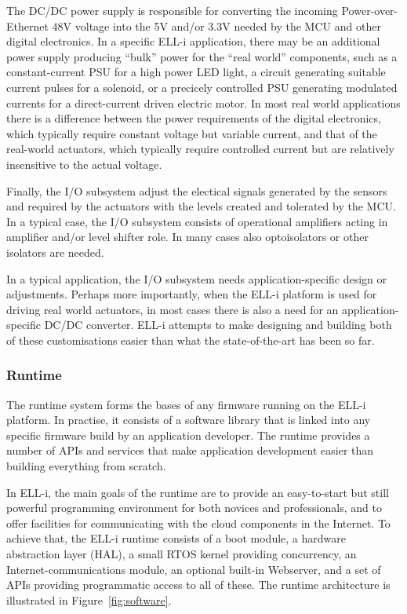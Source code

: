 \documentclass[draft,a4paper]{siamltex}
\begin{document}
The DC/DC power supply is responsible for converting the incoming
Power-over-Ethernet 48V voltage into the 5V and/or 3.3V needed by the
MCU and other digital electronics.  In a specific ELL-i application,
there may be an additional power supply producing ``bulk'' power for
the ``real world'' components, such as a constant-current PSU for a
high power LED light, a circuit generating suitable current pulses for
a solenoid, or a precicely controlled PSU generating modulated
currents for a direct-current driven electric motor.  In most real
world applications there is a difference between the power
requirements of the digital electronics, which typically require
constant voltage but variable current, and that of the real-world
actuators, which typically require controlled current but are
relatively insensitive to the actual voltage.

Finally, the I/O subsystem adjust the electical signals generated by
the sensors and required by the actuators with the levels created and
tolerated by the MCU.  In a typical case, the I/O subsystem consists
of operational amplifiers acting in amplifier and/or level shifter
role.  In many cases also optoisolators or other isolators are needed.

In a typical application, the I/O subsystem needs application-specific
design or adjustments.  Perhaps more importantly, when the ELL-i
platform is used for driving real world actuators, in most cases there
is also a need for an application-specific DC/DC converter.  ELL-i
attempts to make designing and building both of these customisations
easier than what the state-of-the-art has been so far.

\subsubsection{Runtime}

The runtime system forms the bases of any firmware running on the
ELL-i platform.  In practise, it consists of a software library that
is linked into any specific firmware build by an application
developer.  The runtime provides a number of APIs and services that make
application development easier than building everything from scratch.

In ELL-i, the main goals of the runtime are to provide an
easy-to-start but still powerful programming environment for both
novices and professionals, and to offer facilities for communicating
with the cloud components in the Internet.  To achieve that, the ELL-i
runtime consists of a boot module, a hardware abstraction layer (HAL),
a small RTOS kernel providing concurrency, an Internet-communications
module, an optional built-in Webserver, and a set of APIs providing
programmatic access to all of these.  The runtime architecture is
illustrated in Figure~\ref{fig:software}.
\end{document}
